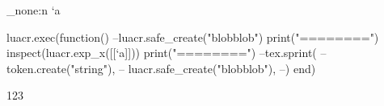 \documentclass[12pt]{article}
\begin{document}
\ExplSyntaxOn
\use_none:n {\the\catcode `a}
\ExplSyntaxOff

\begin{luacode*}
luacr.exec(function()
	--luacr.safe_create("blobblob")
	print("========")
	inspect(luacr.exp_x([[\the\catcode`a]]))
	print("========")
	--tex.sprint({
	--	token.create("string"),
	--	luacr.safe_create("blobblob"),
	--})
end)
\end{luacode*}


123
\end{document}
